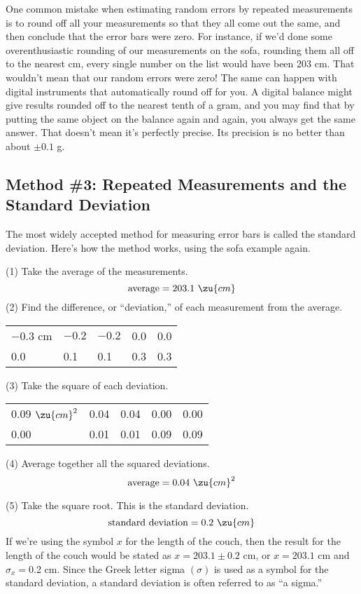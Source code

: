 	One common mistake when estimating random errors by
repeated measurements is to round off all your measurements
so that they all come out the same, and then conclude that
the error bars were zero. For instance, if we'd done some
overenthusiastic rounding of our measurements on the sofa,
rounding them all off to the nearest cm, every single number
on the list would have been 203 cm. That wouldn't mean that
our random errors were zero! The same can happen with
digital instruments that automatically round off for you. A
digital balance might give results rounded off to the
nearest tenth of a gram, and you may find that by putting
the same object on the balance again and again, you always
get the same answer. That doesn't mean it's perfectly
precise. Its precision is no better than about $\pm0.1$ g.

\subsection*{Method \#3: Repeated Measurements and the Standard Deviation}

	The most widely accepted method for measuring error bars is
called the standard deviation. Here's how the method works,
using the sofa example again.

(1) Take the average of the measurements.
\begin{equation*}
			\text{average}  =  203.1\ \zu{cm}  
\end{equation*}
(2) Find the difference, or ``deviation,'' of each
measurement from the average.

\begin{tabular}{lllll}
	$-0.3$ cm &	$-0.2$	& $-0.2$	&0.0	&0.0\\
	0.0	&0.1	&0.1	&0.3	&0.3
\end{tabular}

(3) Take the square of each deviation.

\begin{tabular}{lllll}
	0.09 $\zu{cm}^2$&	0.04	&0.04	&0.00	&0.00\\
	0.00&	0.01&	0.01& 0.09	&0.09
\end{tabular}

(4) Average together all the squared deviations.
\begin{equation*}
			\text{average}  =  0.04\ \zu{cm}^2  
\end{equation*}

(5) Take the square root. This is the standard deviation.
\begin{equation*}
			\text{standard deviation}  =  0.2\ \zu{cm}  
\end{equation*}
If we're using the symbol $x$ for the length of the couch,
then the result for the length of the couch would be stated
as $x= 203.1 \pm 0.2$ cm, or $x=203.1$ cm and $\sigma_x=0$.2
cm. Since the Greek letter sigma $(\sigma)$ is used as a
symbol for the standard deviation, a standard deviation is
often referred to as ``a sigma.''

